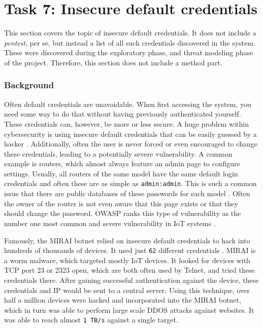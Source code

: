 \section{Task 7: Insecure default credentials}
This section covers the topic of insecure default credentials. It does not include a \textit{pentest}, per se, but instead a list of all such credentials discovered in the system. These were discovered during the exploratory phase, and threat modeling phase of the project. Therefore, this section does not include a method part.

\subsubsection{Background}
Often default credentials are unavoidable. When first accessing the system, you need some way to do that without having previously authenticated yourself. These credentials can, however, be more or less secure. A huge problem within cybersecurity is using insecure default credentials that can be easily guessed by a hacker \cite{owasp-iot-top10}. Additionally, often the user is never forced or even encouraged to change these credentials, leading to a potentially severe vulnerability. A common example is routers, which almost always feature an admin page to configure settings. Usually, all routers of the same model have the same default login credentials and often these are as simple as \texttt{admin:admin}. This is such a common issue that there are public databases of these passwords for each model . Often the owner of the router is not even aware that this page exists or that they should change the password. OWASP ranks this type of vulnerability as the number one most common and severe vulnerability in IoT systems \cite{owasp-iot-top10}.

Famously, the MIRAI botnet relied on insecure default credentials to hack into hundreds of thousands of devices. It used just \texttt{62} different credentials \cite{understanding-mirai}. MIRAI is a worm malware, which targeted mostly IoT devices. It looked for devices with TCP port 23 or 2323 open, which are both often used by Telnet, and tried these credentials there. After gaining successful authentication against the device, these credentials and IP would be sent to a central server. Using this technique, over half a million devices were hacked and incorporated into the MIRAI botnet, which in turn was able to perform large scale DDOS attacks against websites. It was able to reach almost \texttt{1 TB/s} against a single target.

